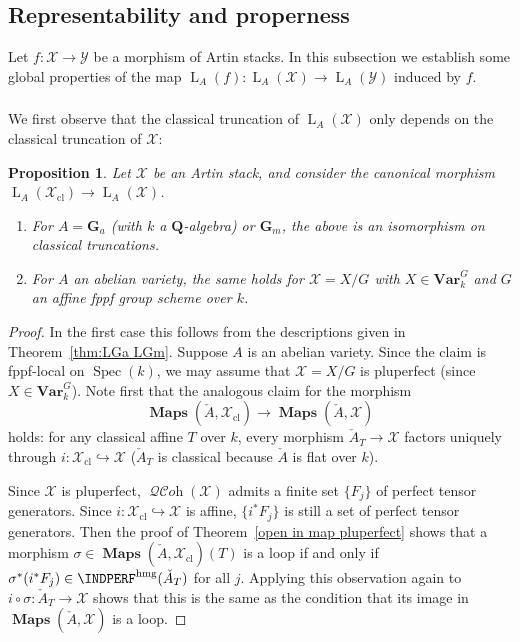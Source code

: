\documentclass[12pt, oneside]{amsart}
\numberwithin{equation}{section}
\newtheorem{proposition}[subsubsection]{Proposition}
\theoremstyle{remark}
\theoremstyle{plain}
\DeclareMathOperator{\QCOH}{\mathcal{QC}\textit{oh}}
\DeclareMathOperator{\MAP}{\mathbf{Maps}}
\newcommand{\Loop}{\operatorname{L}}
\newcommand{\YY}{\mathcal{Y}}
\newcommand{\XX}{\mathcal{X}}
\DeclareMathOperator{\spc}{Spec}
\newcommand{\GGa}{\mathbf{G}_{a}}
\newcommand{\GGm}{\mathbf{G}_{m}}
\newcommand{\bQ}{\mathbf{Q}}
\newcommand{\Var}{\mathbf{Var}_{k}}
\newcommand{\cl}{{\operatorname{cl}}}
\begin{document}
\subsection{Representability and properness}

Let $f : \XX \to \YY$ be a morphism of Artin stacks.
In this subsection we establish some global properties of the map $\Loop_A(f) : \Loop_A(\XX) \to \Loop_A(\YY)$ induced by $f$.

\subsubsection{}

We first observe that the classical truncation of $\Loop_A(\XX)$ only depends on the classical truncation of $\XX$:

\begin{proposition}\label{prop:Loop cl}
Let $\XX$ be an Artin stack, and consider the canonical morphism $\Loop_A(\XX_\cl) \to \Loop_A(\XX)$.
\begin{enumerate}
	\item For $A=\GGa$ (with $k$ a $\bQ$-algebra) or $\GGm$, the above is an isomorphism on classical truncations.
	\item For $A$ an abelian variety, the same holds for $\XX=X/G$ with $X \in \Var^G$ and $G$ an affine fppf group scheme over $k$.
\end{enumerate}
\end{proposition}
\begin{proof}
In the first case this follows from the descriptions given in Theorem~\ref{thm:LGa LGm}.
Suppose $A$ is an abelian variety.
Since the claim is fppf-local on $\spc(k)$, we may assume that $\XX = X/G$ is pluperfect (since $X \in \Var^G$).
Note first that the analogous claim for the morphism
\[
  \MAP(\check{A}, \XX_\cl) \to \MAP(\check{A}, \XX)
\]
holds: for any classical affine $T$ over $k$, every morphism $\check{A}_T \to \XX$ factors uniquely through $i : \XX_\cl \hookrightarrow \XX$ ($\check{A}_T$ is classical because $\check{A}$ is flat over $k$).

Since $\XX$ is pluperfect, $\QCOH(\XX)$ admits a finite set $\{F_j\}$ of perfect tensor generators.
Since $i : \XX_\cl \hookrightarrow \XX$ is affine, $\{i^*F_j\}$ is still a set of perfect tensor generators.
Then the proof of Theorem~\ref{open in map pluperfect} shows that a morphism $\sigma \in \MAP(\check{A}, \XX_\cl)(T)$ is a loop if and only if $\sigma^* (i^* F_j) \in \INDPERF^{\mathrm{hmg}}(\check{A}_T)$ for all $j$.
Applying this observation again to $i\circ \sigma : \check{A}_T \to \XX$ shows that this is the same as the condition that its image in $\MAP(\check{A}, \XX)$ is a loop.
\end{proof}
\end{document}

